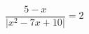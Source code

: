 \begin{ex}[type=equation]
	\begin{condition}
		$\dfrac{5 - x}{\big|x^2 - 7x + 10\big|}= 2$
	\end{condition}
\end{ex}